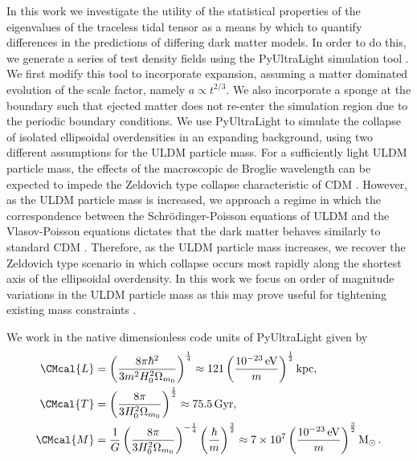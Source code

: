 \documentclass[a4paper,11pt]{article}
\begin{document}
In this work we investigate the utility of the statistical properties of the eigenvalues of the traceless tidal tensor as a means by which to quantify differences in the predictions of differing dark matter models. In order to do this, we generate a series of test density fields using the {\sc PyUltraLight} simulation tool \cite{Edwards:2018ccc}. We first modify this tool to incorporate expansion, assuming a matter dominated evolution of the scale factor, namely $a\propto t^{2/3}$. We also incorporate a sponge at the boundary such that ejected matter does not re-enter the simulation region due to the periodic boundary conditions. We use {\sc PyUltraLight} to simulate the collapse of isolated ellipsoidal overdensities in an expanding background, using two different assumptions for the ULDM particle mass. For a sufficiently light ULDM particle mass, the effects of the macroscopic de Broglie wavelength can be expected to impede the Zeldovich type collapse characteristic of CDM \cite{Zeldovich:1969sb}. However, as the ULDM particle mass is increased, we approach a regime in which the correspondence between the Schr{\"o}dinger-Poisson equations of ULDM and the Vlasov-Poisson equations dictates that the dark matter behaves similarly to standard CDM \cite{Mocz:2018ium}. Therefore, as the ULDM particle mass increases, we recover the Zeldovich type scenario in which collapse occurs most rapidly along the shortest axis of the ellipsoidal overdensity. In this work we focus on order of magnitude variations in the ULDM particle mass as this may prove useful for tightening existing mass constraints \cite{Marsh:2018zyw, Armengaud:2017nkf, Irsic:2017yje}. 

We work in the native dimensionless code units of {\sc PyUltraLight} given by 
\begin{align}
    \CMcal{L}&=\left(\frac{8\pi\hbar^2}{3 m^2H_0^2\Omega_{m_0}}\right)^{\frac{1}{4}}\approx121\left(\frac{10^{-23}\operatorname{eV}}{m}\right)^{\frac{1}{2}}\operatorname{kpc},\label{eq:length}\\
    \CMcal{T}&=\left(\frac{8\pi}{3 H_0^2\Omega_{m_0}}\right)^{\frac{1}{2}}\approx75.5 \operatorname{Gyr},\label{eq:time}\\
    \CMcal{M}&=\frac{1}{G}\left(\frac{8\pi}{3 H_0^2\Omega_{m_0}}\right)^{-\frac{1}{4}}\left(\frac{\hbar}{m}\right)^{\frac{3}{2}}\approx 7\times 10^7\left(\frac{10^{-23}\operatorname{eV}}{m}\right)^{\frac{3}{2}}\operatorname{M}_{\odot}.\label{eq:mass}
\end{align}
\end{document}
